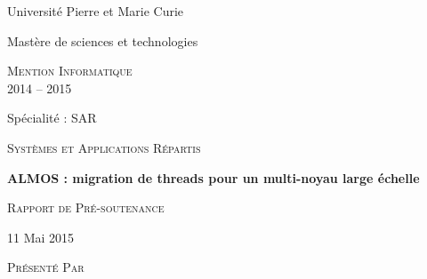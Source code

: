 \begin{titlepage}  

  {\begin{center}\huge\textsf{Université Pierre et Marie Curie}\end{center}}


  \vspace{0.4cm}
  

  {\begin{center}\huge\textsf{Mastère de sciences et technologies}\end{center}}
  
  \vspace{0.4cm}
  
  {\begin{center}\huge\textsc{Mention Informatique \\2014 -- 2015} \end{center}}
  
  \vspace{0.4cm}
  
  {\begin{center}\huge\textsf{Spécialité : SAR}\end{center}}
  
  {\begin{center}\large\textsc{Systèmes et Applications Répartis }\end{center}}
  
  \vspace{0.4cm}

  {\begin{center}\Huge\textbf{ALMOS : migration de threads pour un multi-noyau
        large échelle}\end{center}}
  
  \vspace{0.4cm}
  
  {\begin{center}\huge\textsc{Rapport de Pré-soutenance}\end{center}}
  
  \vspace{0.4cm}
  
  {\begin{center}\large\textsf {11 Mai 2015 }\end{center}}
  
  \vspace{0.4cm}
  
  {\begin{center}\Large\textsc{Présenté Par}\end{center}}
  

\end{titlepage}
